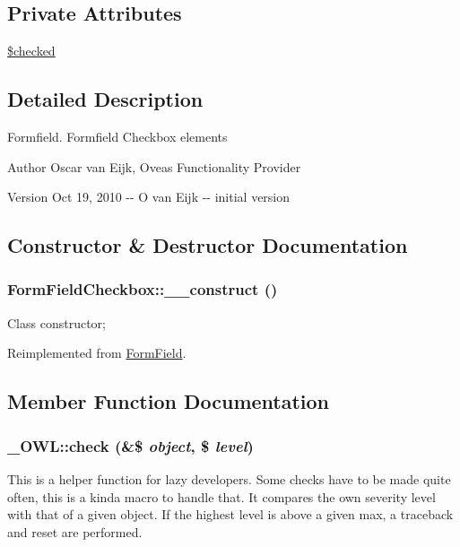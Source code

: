 \subsection*{Private Attributes}
\begin{DoxyCompactItemize}
\item 
\hyperlink{classFormFieldCheckbox_a4abeb3a9445b5f31e84e32d257037f2a}{\$checked}
\end{DoxyCompactItemize}


\subsection{Detailed Description}
Formfield. Formfield Checkbox elements \begin{DoxyAuthor}{Author}
Oscar van Eijk, Oveas Functionality Provider 
\end{DoxyAuthor}
\begin{DoxyVersion}{Version}
Oct 19, 2010 -\/-\/ O van Eijk -\/-\/ initial version 
\end{DoxyVersion}


\subsection{Constructor \& Destructor Documentation}
\subsubsection[{\_\-\_\-construct}]{\setlength{\rightskip}{0pt plus 5cm}FormFieldCheckbox::\_\-\_\-construct ()}\label{classFormFieldCheckbox_a9ea37cd03013e361f11680049c1a0097}
Class constructor; 

Reimplemented from \hyperlink{classFormField_a0cfe713ce28a6a0cb53476ed463e1f01}{FormField}.



\subsection{Member Function Documentation}
\subsubsection[{check}]{\setlength{\rightskip}{0pt plus 5cm}\_\-OWL::check (\&\$ {\em object}, \/  \$ {\em level})}\label{class__OWL_ad6f4f6946f40199dd0333cf219fa500e}
This is a helper function for lazy developers. Some checks have to be made quite often, this is a kinda macro to handle that. It compares the own severity level with that of a given object. If the highest level is above a given max, a traceback and reset are performed.


